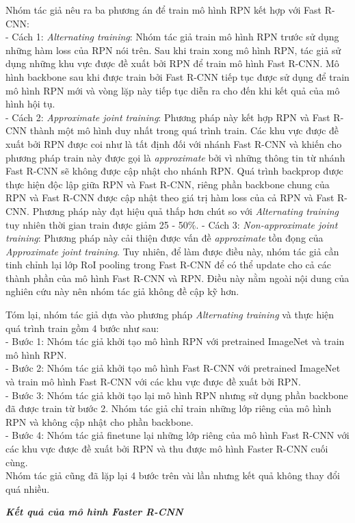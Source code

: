 {    \noindent
    Nhóm tác giả nêu ra ba phương án để train mô hình RPN kết hợp với Fast R-CNN: \\
    - Cách 1: \textit{Alternating training}: Nhóm tác giả train mô hình RPN trước sử dụng những hàm loss của RPN nói trên.
    Sau khi train xong mô hình RPN, tác giả sử dụng những khu vực được đề xuất bởi RPN để train mô hình Fast R-CNN.
    Mô hình backbone sau khi được train bởi Fast R-CNN tiếp tục được sử dụng để train mô hình RPN mới và vòng lặp này tiếp tục diễn ra cho đến khi kết quả của mô hình hội tụ. \\
    - Cách 2: \textit{Approximate joint training}: Phương pháp này kết hợp RPN và Fast R-CNN thành một mô hình duy nhất trong quá trình train.
    Các khu vực được đề xuất bởi RPN được coi như là tất định đối với nhánh Fast R-CNN và khiến cho phương pháp train này được gọi là \textit{approximate} bởi vì những thông tin từ nhánh Fast R-CNN sẽ không được cập nhật cho nhánh RPN.
    Quá trình backprop được thực hiện độc lập giữa RPN và Fast R-CNN, riêng phần backbone chung của RPN và Fast R-CNN được cập nhật theo giá trị hàm loss của cả RPN và Fast R-CNN.
    Phương pháp này đạt hiệu quả thấp hơn chút so với \textit{Alternating training} tuy nhiên thời gian train được giảm 25 - 50\%.
    - Cách 3: \textit{Non-approximate joint training}: Phương pháp này cải thiện được vấn đề \textit{approximate} tồn đọng của \textit{Approximate joint training}.
    Tuy nhiên, để làm được điều này, nhóm tác giả cần tinh chỉnh lại lớp RoI pooling trong Fast R-CNN để có thể update cho cả các thành phần của mô hình Fast R-CNN và RPN.
    Điều này nằm ngoài nội dung của nghiên cứu này nên nhóm tác giả không đề cập kỹ hơn.

    \noindent
    Tóm lại, nhóm tác giả dựa vào phương pháp \textit{Alternating training} và thực hiện quá trình train gồm 4 bước như sau: \\
    - Bước 1: Nhóm tác giả khởi tạo mô hình RPN với pretrained ImageNet và train mô hình RPN. \\
    - Bước 2: Nhóm tác giả khởi tạo mô hình Fast R-CNN với pretrained ImageNet và train mô hình Fast R-CNN với các khu vực được đề xuất bởi RPN. \\
    - Bước 3: Nhóm tác giả khởi tạo lại mô hình RPN nhưng sử dụng phần backbone đã được train từ bước 2.
    Nhóm tác giả chỉ train những lớp riêng của mô hình RPN và không cập nhật cho phần backbone. \\
    - Bước 4: Nhóm tác giả finetune lại những lớp riêng của mô hình Fast R-CNN với các khu vực được đề xuất bởi RPN và thu được mô hình Faster R-CNN cuối cùng. \\
    Nhóm tác giả cũng đã lặp lại 4 bước trên vài lần nhưng kết quả không thay đổi quá nhiều.

    \noindent
    \textbf{\textit{Kết quả của mô hình Faster R-CNN}} \\

}